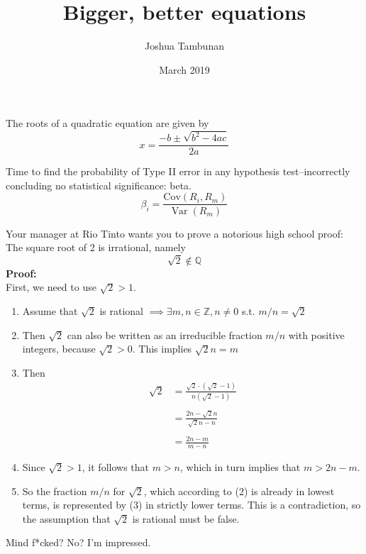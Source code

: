 \documentclass{article}
\title{Bigger, better equations}
\author{Joshua Tambunan}
\date{March 2019}
\begin{document}
 
\maketitle

The roots of a quadratic equation are given by 
\begin{equation}
    x = \frac{-b \pm \sqrt {b^2 - 4ac}}
             {2a}
\end{equation}

Time to find the probability of Type II error in any hypothesis test–incorrectly concluding no statistical significance: beta.
\begin{equation*}
    \beta_i = 
    \frac{\text{Cov}(R_i, R_m)}
         {\operatorname{Var}(R_m)}
\end{equation*}

Your manager at Rio Tinto wants you to prove a notorious high school proof:
The square root of 2 is irrational, namely $$\sqrt{2} \not\in \mathbb{Q}$$
\textbf{Proof:}\\
First, we need to use $\sqrt{2} > 1$.
\begin{enumerate}
    \item Assume that $\sqrt{2}$ is rational $\implies \exists m, n \in \mathbb{Z},
          n \neq 0$ s.t. $m/n = \sqrt{2}$
    \item Then $\sqrt{2}$ can also be written as an irreducible fraction $m/n$ with
            positive integers, because $\sqrt{2} > 0$. This implies $\sqrt{2}n = m$
    \item Then
    \begin{align*}
        \sqrt{2} &= \frac{\sqrt{2} \cdot (\sqrt{2}-1)}
                         {n(\sqrt{2}-1)}\\~\\
                 &= \frac{2n - \sqrt{2}n}
                         {\sqrt{2}n-n}\\~\\
                 &= \frac{2n - m}{m - n}
    \end{align*}
    \item Since $\sqrt{2} > 1$, it follows that $m > n$, which in turn implies that         $m > 2n - m$.
    \item So the fraction $m/n$ for $\sqrt{2}$, which according to (2) is already in lowest terms, is represented by (3) in strictly lower terms. This is a contradiction, so the assumption that $\sqrt{2}$ is rational must be false.
\end{enumerate}

Mind f*cked? No? I'm impressed.
\end{document}
